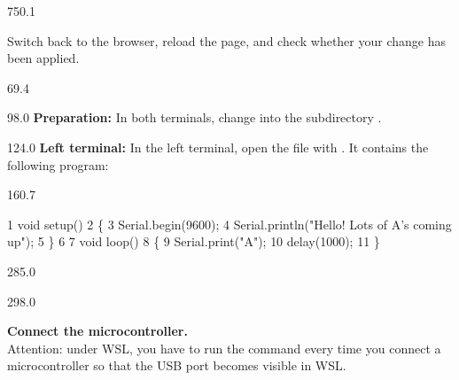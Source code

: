 \documentclass{aslab}
\makeatletter
\newcommand*\aN[1]{\textcolor{codeorange}{#1}}%
\newcommand*\aI[1]{\textcolor{codegreen}{#1}}%
\newcommand*\aK[1]{\textcolor{codered}{#1}}%
\newcommand*\aR[1]{\textcolor{codecyan}{#1}}%
\newenvironment{asmlisting}[1][11]{\par
  \edef\asm@bs{\the\baselineskip}\fontsize{#1bp}{\asm@bs}\selectfont
  \ttfamily\asm@setup}{\par}
\makeatother
\begin{document}
\begin{region}{750.1}
\begin{alphatasks}[start=5]
\item Switch back to the browser, reload the page, and check whether your
  change has been applied.
\end{alphatasks}
\end{region}

\nextpage
\begin{region}{69.4}
\end{region}

\begin{region}{98.0}
\textbf{Preparation:} In both terminals, change into the subdirectory
.
\end{region}

\begin{region}[pitch=13]{124.0}
\textbf{Left terminal:} In the left terminal, open the file
 with . It contains the following program:
\end{region}

\begin{region}[pitch=10]{160.7}
\begin{asmlisting}[9]
  \aN{1} \aI{void} \aR{setup}()
  \aN{2} \{
  \aN{3}     \aR{Serial}.\aR{begin}(\aK{9600});
  \aN{4}     \aR{Serial}.\aR{println}(\aK{"Hello! Lots of A's coming up"});
  \aN{5} \}
  \aN{6}
  \aN{7} \aI{void} \aR{loop}()
  \aN{8} \{
  \aN{9}     \aR{Serial}.\aR{print}(\aK{"A"});
 \aN{10}     \aR{delay}(\aK{1000});
 \aN{11} \}
\end{asmlisting}
\end{region}

\begin{region}{285.0}
\end{region}

\begin{region}[pitch=12.15]{298.0}
\begin{numlist}
\item \textbf{Connect the microcontroller.}\\
  Attention: under WSL, you have to run the command  every
  time you connect a microcontroller so that the USB port becomes visible in
  WSL.
\end{numlist}
\end{region}
\end{document}
